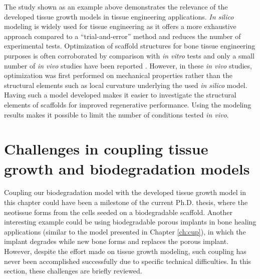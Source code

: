 The study shown as an example above \cite{Hede2021} demonstrates the relevance of the developed tissue growth models in tissue engineering applications. \textit{In silico} modeling is widely used for tissue engineering as it offers a more exhaustive approach compared to a ``trial-and-error'' method and reduces the number of experimental tests. Optimization of scaffold structures for bone tissue engineering purposes is often corroborated by comparison with \textit{in vitro} tests \cite{Alias2017,Rubert2021} and only a small number of \textit{in vivo} studies have been reported \cite{Long2012,Luo2017,Luo2015}. However, in these \textit{in vivo} studies, optimization was first performed on mechanical properties rather than the structural elements such as local curvature underlying the used \textit{in silico} model. Having such a model developed makes it easier to investigate the structural elements of scaffolds for improved regenerative performance. Using the modeling results makes it possible to limit the number of conditions tested \textit{in vivo}.

\section{Challenges in coupling tissue growth and biodegradation models}

Coupling our biodegradation model \cite{Barzegari2021} with the developed tissue growth model in this chapter could have been a milestone of the current Ph.D. thesis, where the neotissue forms from the cells seeded on a biodegradable scaffold. Another interesting example could be using biodegradable porous implants in bone healing applications (similar to the model presented in Chapter \ref{ch:cup}), in which the implant degrades while new bone forms and replaces the porous implant. However, despite the effort made on tissue growth modeling, such coupling has never been accomplished successfully due to specific technical difficulties. In this section, these challenges are briefly reviewed. 

